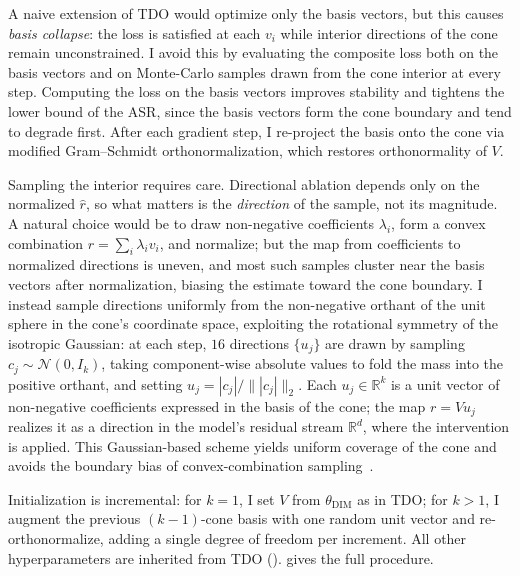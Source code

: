 \documentclass[sn-basic]{sn-jnl}
\newcommand{\dimv}{\theta_{\text{DIM}}}
\begin{document}
A naive extension of TDO would optimize only the basis vectors, but this causes
\emph{basis collapse}: the loss is satisfied at each $v_i$ while interior
directions of the cone remain unconstrained. I avoid this by evaluating the
composite loss both on the basis vectors and on Monte-Carlo samples drawn from
the cone interior at every step. Computing the loss on the basis vectors
improves stability and tightens the lower bound of the ASR, since the basis
vectors form the cone boundary and tend to degrade first. After each gradient
step, I re-project the basis onto the cone via modified Gram--Schmidt
orthonormalization, which restores orthonormality of $V$.

Sampling the interior requires care. Directional ablation depends only on the
normalized $\hat{r}$, so what matters is the \emph{direction} of the sample,
not its magnitude. A natural choice would be to draw non-negative coefficients
$\lambda_i$, form a convex combination $r = \sum_i \lambda_i v_i$, and
normalize; but the map from coefficients to normalized directions is uneven,
and most such samples cluster near the basis vectors after normalization,
biasing the estimate toward the cone boundary. I instead sample directions
uniformly from the non-negative orthant of the unit sphere in the cone's
coordinate space, exploiting the rotational symmetry of the isotropic
Gaussian: at each step, $16$ directions $\{u_j\}$ are drawn by sampling
$c_j \sim \mathcal{N}(0, I_k)$, taking component-wise absolute values to fold
the mass into the positive orthant, and setting
$u_j = |c_j| / \| |c_j| \|_2$. Each $u_j \in \mathbb{R}^k$ is a unit vector of
non-negative coefficients expressed in the basis of the cone; the map
$r = V u_j$ realizes it as a direction in the model's residual stream
$\mathbb{R}^d$, where the intervention is applied. This Gaussian-based scheme
yields uniform coverage of the cone and avoids the boundary bias of
convex-combination sampling~\citep{wollschlagerGeometryRefusalLarge2025}.

Initialization is incremental: for $k = 1$, I set $V$ from $\dimv$ as in TDO;
for $k > 1$, I augment the previous $(k{-}1)$-cone basis with one random unit
vector and re-orthonormalize, adding a single degree of freedom per increment.
All other hyperparameters are inherited from TDO ().
 gives the full procedure.
\end{document}
